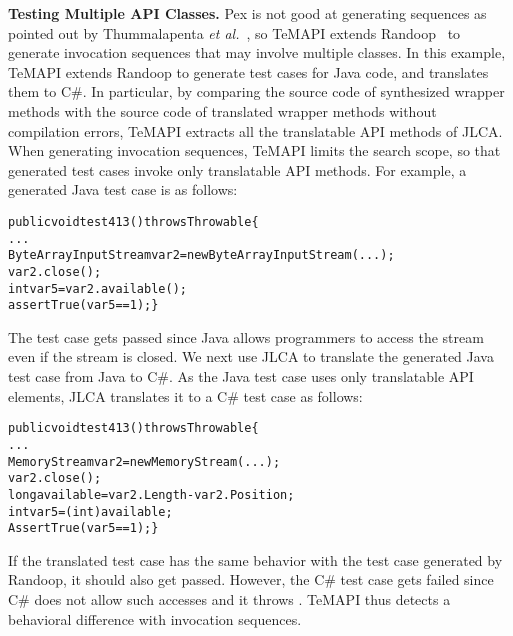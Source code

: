 \textbf{Testing Multiple API Classes.} Pex is not good at generating sequences as pointed out by Thummalapenta \emph{et al.}~\cite{thummalapenta09:mseqgen}, so TeMAPI extends Randoop~\cite{pacheco2007feedback} to generate invocation sequences that may involve multiple classes. In this example, TeMAPI extends Randoop to generate test cases for Java code, and translates them to C\#. In particular, by comparing the source code of synthesized wrapper methods with the source code of translated wrapper methods without compilation errors, TeMAPI extracts all the translatable API methods of JLCA. When generating invocation sequences, TeMAPI limits the search scope, so that generated test cases invoke only translatable API methods. For example, a generated Java test case is as follows:

\begin{CodeOut}\vspace*{-1ex}
\begin{alltt}
public void test413() throws Throwable\{
  ...
  ByteArrayInputStream var2=new ByteArrayInputStream(...);
  var2.close();
  int var5=var2.available();
  assertTrue(var5 == 1);\}
\end{alltt}
\end{CodeOut}\vspace*{-2ex}


The test case gets passed since Java allows programmers to access the stream even if the stream is closed. We next use JLCA to translate the generated Java test case from Java to C\#. As the Java test case uses only translatable API elements, JLCA translates it to a C\# test case as follows:

\begin{CodeOut}\vspace*{-1ex}
\begin{alltt}
public void test413() throws Throwable\{
  ...
  MemoryStream var2 = new MemoryStream(...);
  var2.close();
  long available = var2.Length - var2.Position;
  int var5 = (int) available;
  AssertTrue(var5 == 1);\}
\end{alltt}
\end{CodeOut}\vspace*{-2ex}

If the translated test case has the same behavior with the test case generated by Randoop, it should also get passed. However, the C\# test case gets failed since C\# does not allow such accesses and it throws . TeMAPI thus detects a behavioral difference with invocation sequences.

